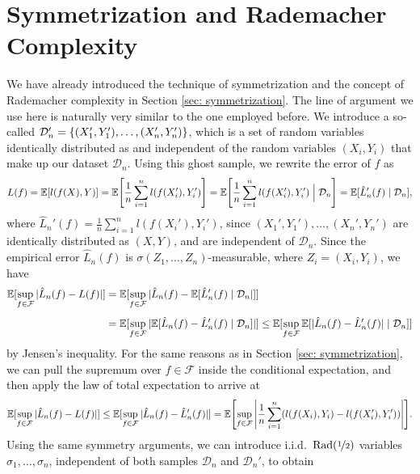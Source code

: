 \section{Symmetrization and Rademacher Complexity}
\label{subsec: rademacher complexity for general loss function}

We have already introduced the technique of symmetrization and the concept of Rademacher complexity in Section \ref{sec: symmetrization}. The line of argument we use here is naturally very similar to the one employed before. We introduce a so-called  $\mathcal{D}_n' = \set{(X_1', Y_1'), \dots, (X_n', Y_n')}$, which is a set of random variables identically distributed as and independent of the random variables $(X_i, Y_i)$ that make up our dataset $\mathcal{D}_n$. Using this ghost sample, we rewrite the error of $f$ as
\[
    L(f) = \Exp[l(f(X), Y)] = \Exp\left[\frac{1}{n} \sum_{i=1}^n l(f(X_i'), Y_i')\right] = \Exp\left[\frac{1}{n} \sum_{i=1}^n l(f(X_i'), Y_i') \given[\Big] \mathcal{D}_n\right] = \Exp[\hat{L}_n'(f) \given \mathcal{D}_n],
\]
where $\hat{L}_n'(f) = \frac{1}{n} \sum_{i=1}^n l(f(X_i'), Y_i')$, since $(X_1', Y_1'), \dots, (X_n', Y_n')$ are identically distributed as $(X, Y)$, and are independent of $\mathcal{D}_n$. Since the empirical error $\hat{L}_n(f)$ is $\sigma(Z_1, \dots, Z_n)$-measurable, where $Z_i = (X_i, Y_i)$, we have
\begin{align*}
    \Exp[\sup_{f \in \mathcal{F}} \abs*{\hat L_n(f) - L(f)}] &= \Exp[\sup_{f \in \mathcal{F}} \abs*{\hat{L}_n(f) - \Exp[\hat{L}_n'(f) \given \mathcal{D}_n}]] \\[4pt]
    &= \Exp[\sup_{f \in \mathcal{F}} \abs*{\Exp[\hat{L}_n(f) - \hat{L}_n'(f) \given \mathcal{D}_n]}] \leq \Exp[\sup_{f \in \mathcal{F}} \Exp[\abs*{\hat{L}_n(f) -\hat{L}_n'(f)} \given \mathcal{D}_n]]
\end{align*}
by Jensen's inequality. For the same reasons as in Section \ref{sec: symmetrization}, we can pull the supremum over $f \in \mathcal{F}$ inside the conditional expectation, and then apply the law of total expectation to arrive at
\[
    \Exp[\sup_{f \in \mathcal{F}} \abs*{\hat{L}_n(f) - L(f)}] \leq \Exp[\sup_{f \in \mathcal{F}} \abs*{\hat{L}_n(f) -\hat{L}_n'(f)}] = \Exp\left[\sup_{f \in \mathcal{F}} \abs{\frac{1}{n} \sum_{i=1}^n (l(f(X_i), Y_i) - l(f(X_i'), Y_i'))}\right].
\]
Using the same symmetry arguments, we can introduce i.i.d.\ $\operatorname{Rad}(\nicefrac{1}{2})$ variables $\sigma_1, \dots, \sigma_n$, independent of both samples $\mathcal{D}_n$ and $\mathcal{D}_n'$, to obtain
